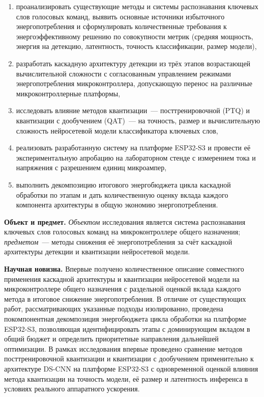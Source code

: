 \begin{enumerate}
	\item проанализировать существующие методы и системы распознавания
	      ключевых слов голосовых команд, выявить основные источники
	      избыточного энергопотребления и сформулировать количественные
	      требования к энергоэффективному решению по совокупности метрик
	      (средняя мощность, энергия на детекцию, латентность, точность
	      классификации, размер модели),
	\item разработать каскадную архитектуру детекции из трёх этапов
	      возрастающей вычислительной сложности с согласованным
	      управлением режимами энергопотребления микроконтроллера,
	      допускающую перенос на различные микроконтроллерные платформы,
	\item исследовать влияние методов квантизации~--- посттренировочной
	      (PTQ) и квантизации с дообучением (QAT)~--- на точность,
	      размер и вычислительную сложность нейросетевой модели
	      классификатора ключевых слов,
	\item реализовать разработанную систему на платформе ESP32-S3 и
	      провести её экспериментальную апробацию на лабораторном стенде
	      с измерением тока и напряжения с разрешением единиц микроампер,
	\item выполнить декомпозицию итогового энергобюджета цикла каскадной
	      обработки по этапам и дать количественную оценку вклада каждого
	      компонента архитектуры в общую экономию энергопотребления.
\end{enumerate}

\textbf{Объект и предмет.} \textit{Объектом} исследования является
система распознавания ключевых слов голосовых команд на микроконтроллере
общего назначения; \textit{предметом}~--- методы снижения её
энергопотребления за счёт каскадной архитектуры детекции и квантизации
нейросетевой модели.

\textbf{Научная новизна.} Впервые получено количественное описание
совместного применения каскадной архитектуры и квантизации нейросетевой
модели на микроконтроллере общего назначения с раздельной оценкой вклада
каждого метода в итоговое снижение энергопотребления. В отличие от
существующих работ, рассматривающих указанные подходы изолированно,
проведена покомпонентная декомпозиция энергобюджета цикла обработки на
платформе ESP32-S3, позволяющая идентифицировать этапы с доминирующим
вкладом в общий бюджет и определить приоритетные направления дальнейшей
оптимизации. В рамках исследования впервые проведено сравнение методов
посттренировочной квантизации и квантизации с дообучением применительно
к архитектуре DS-CNN на платформе ESP32-S3 с одновременной оценкой
влияния метода квантизации на точность модели, её размер и латентность
инференса в условиях реального аппаратного ускорения.

